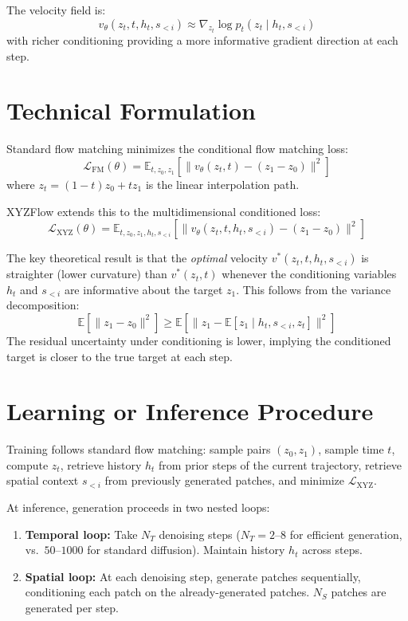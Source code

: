 \documentclass[10pt,twocolumn]{article}
\begin{document}
The velocity field is:
\[
  v_\theta(z_t, t, h_t, s_{<i}) \approx \nabla_{z_t} \log p_t(z_t \mid h_t, s_{<i})
\]
with richer conditioning providing a more informative gradient direction at each step.

\section{Technical Formulation}

Standard flow matching minimizes the conditional flow matching loss:
\[
  \mathcal{L}_{\text{FM}}(\theta) = \mathbb{E}_{t, z_0, z_1}
  \left[\|v_\theta(z_t, t) - (z_1 - z_0)\|^2\right]
\]
where $z_t = (1-t)z_0 + tz_1$ is the linear interpolation path.

XYZFlow extends this to the multidimensional conditioned loss:
\[
  \mathcal{L}_{\text{XYZ}}(\theta) = \mathbb{E}_{t, z_0, z_1, h_t, s_{<i}}
  \left[\|v_\theta(z_t, t, h_t, s_{<i}) - (z_1 - z_0)\|^2\right]
\]

The key theoretical result is that the \emph{optimal} velocity $v^*(z_t, t, h_t, s_{<i})$
is straighter (lower curvature) than $v^*(z_t, t)$ whenever the conditioning
variables $h_t$ and $s_{<i}$ are informative about the target $z_1$.
This follows from the variance decomposition:
\[
  \mathbb{E}[\|z_1 - z_0\|^2] \geq \mathbb{E}[\|z_1 - \mathbb{E}[z_1 \mid h_t, s_{<i}, z_t]\|^2]
\]
The residual uncertainty under conditioning is lower, implying the conditioned
target is closer to the true target at each step.

\section{Learning or Inference Procedure}

Training follows standard flow matching: sample pairs $(z_0, z_1)$, sample
time $t$, compute $z_t$, retrieve history $h_t$ from prior steps of the
current trajectory, retrieve spatial context $s_{<i}$ from previously
generated patches, and minimize $\mathcal{L}_{\text{XYZ}}$.

At inference, generation proceeds in two nested loops:
\begin{enumerate}[itemsep=2pt,parsep=0pt]
  \item \textbf{Temporal loop:} Take $N_T$ denoising steps ($N_T = 2$--$8$
    for efficient generation, vs.\ $50$--$1000$ for standard diffusion).
    Maintain history $h_t$ across steps.
  \item \textbf{Spatial loop:} At each denoising step, generate patches
    sequentially, conditioning each patch on the already-generated patches.
    $N_S$ patches are generated per step.
\end{enumerate}
\end{document}
